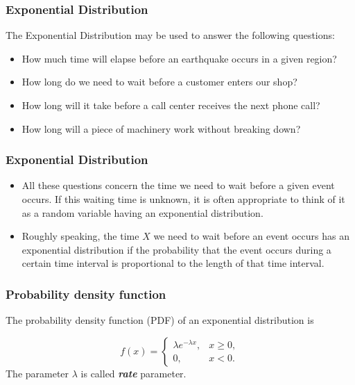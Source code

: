 \documentclass[IntroMain.tex]{subfiles}
\begin{document}

\begin{frame}[fragile]
	\frametitle{Exponential Distribution}
	The Exponential Distribution may be used to answer the following questions:
	\begin{itemize}
		\item How much time will elapse before an earthquake occurs in a given region?
		\item How long do we need to wait before a customer enters our shop?
		\item How long will it take before a call center receives the next phone call?
		\item How long will a piece of machinery work without breaking down?
	\end{itemize}
\end{frame}

\begin{frame}[fragile]
	\frametitle{Exponential Distribution}
	
	\begin{itemize}
		\item All these questions concern the time we need to wait before a given event occurs. If this waiting time is unknown, it is often appropriate to think of it as a random variable having an exponential distribution.
		\item Roughly speaking, the time $X$ we need to wait before an event occurs has an exponential distribution if the probability that the event occurs during a certain time interval is proportional to the length of that time interval.
		
	\end{itemize}
\end{frame}

\begin{frame}[fragile]
	\frametitle{Probability density function}
	The probability density function (PDF) of an exponential distribution is
	
	\[
	f(x) = \begin{cases}
	\lambda e^{-\lambda x}, & x \ge 0, \\
	0, & x < 0.
	\end{cases}\]
	The parameter $\lambda$  is called \textbf{\emph{rate}} parameter.
\end{frame}
\end{document}
